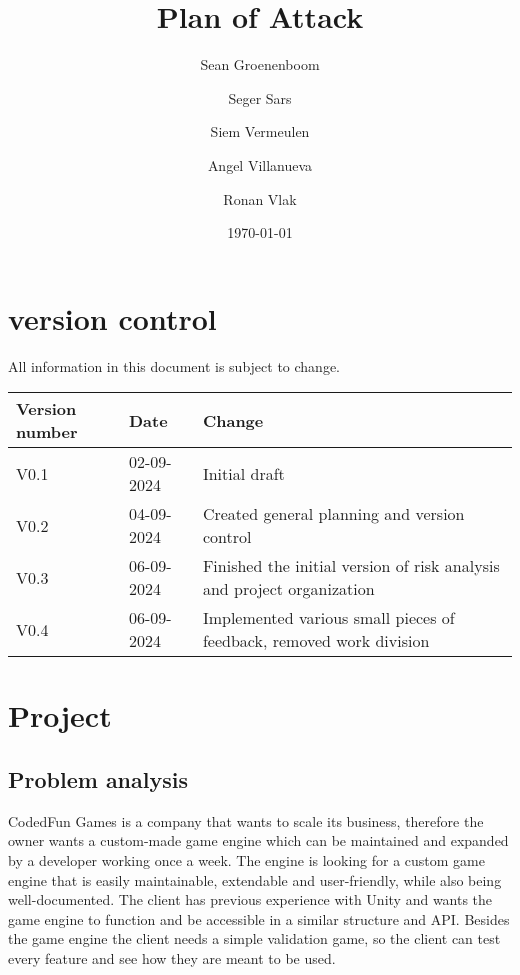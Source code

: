 \documentclass{article} %
\title{Plan of Attack} %
\author{Sean Groenenboom \and Seger Sars \and Siem Vermeulen \and Angel Villanueva \and Ronan Vlak} %
\date{\today} %
\begin{document}
\maketitle %
\newpage

\tableofcontents %
\newpage

\section{version control}
All information in this document is subject to change. \\
\begin{tabularx}{\textwidth}{|X|X|X|}
    \hline
    \textbf{Version number} & \textbf{Date} & \textbf{Change}                                                        \\ \hline
    V0.1                    & 02-09-2024    & Initial draft                                                          \\ \hline
    V0.2                    & 04-09-2024    & Created general planning and version control                           \\ \hline
    V0.3                    & 06-09-2024    & Finished the initial version of risk analysis and project organization \\ \hline
    V0.4                    & 06-09-2024    & Implemented various small pieces of feedback, removed work division    \\ \hline
\end{tabularx}
\newpage

\section{Project}
\subsection{Problem analysis}
CodedFun Games is a company that wants to scale its business, therefore
the owner wants a custom-made game engine which can be maintained and expanded by a developer working once a week.
The engine is looking for a custom game engine that is easily maintainable, extendable and user-friendly, while also being well-documented.
The client has previous experience with Unity and wants the game engine to function and be accessible in a similar structure and API.
\newline \newline
Besides the game engine the client needs a simple validation game, so the client can test every feature and see how they are meant to be used.
\end{document}
